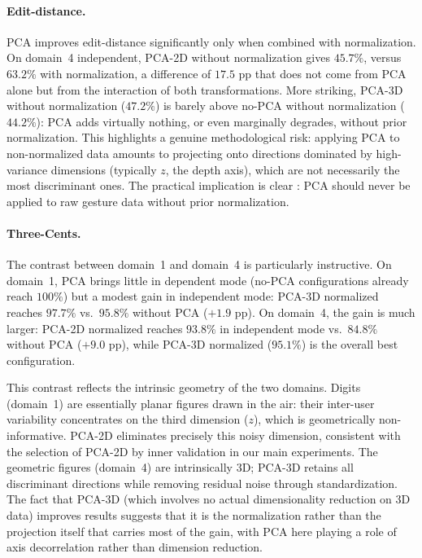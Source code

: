 \paragraph{Edit-distance.}
PCA improves edit-distance significantly only when combined with normalization. On
domain~4 independent, PCA-2D without normalization gives $45.7\%$, versus $63.2\%$ with
normalization, a difference of $17.5$ pp that does not come from PCA alone but from
the interaction of both transformations. More striking, PCA-3D without normalization
($47.2\%$) is barely above no-PCA without normalization ($44.2\%$): PCA adds virtually
nothing, or even marginally degrades, without prior normalization. This highlights a
genuine methodological risk: applying PCA to non-normalized data amounts to projecting
onto directions dominated by high-variance dimensions (typically $z$, the depth axis),
which are not necessarily the most discriminant ones. The practical implication is clear :
PCA should never be applied to raw gesture data without prior normalization.

\paragraph{Three-Cents.}
The contrast between domain~1 and domain~4 is particularly instructive. On domain~1,
PCA brings little in dependent mode (no-PCA configurations already reach $100\%$) but a
modest gain in independent mode: PCA-3D normalized reaches $97.7\%$ vs.\ $95.8\%$
without PCA ($+1.9$ pp). On domain~4, the gain is much larger: PCA-2D normalized
reaches $93.8\%$ in independent mode vs.\ $84.8\%$ without PCA ($+9.0$ pp), while
PCA-3D normalized ($95.1\%$) is the overall best configuration.

This contrast reflects the intrinsic geometry of the two domains. Digits (domain~1) are
essentially planar figures drawn in the air: their inter-user variability concentrates
on the third dimension ($z$), which is geometrically non-informative. PCA-2D eliminates
precisely this noisy dimension, consistent with the selection of PCA-2D by inner
validation in our main experiments. The geometric figures (domain~4) are intrinsically
3D; PCA-3D retains all discriminant directions while removing residual noise through
standardization. The fact that PCA-3D (which involves no actual dimensionality
reduction on 3D data) improves results suggests that it is the normalization rather
than the projection itself that carries most of the gain, with PCA here playing a role
of axis decorrelation rather than dimension reduction.


